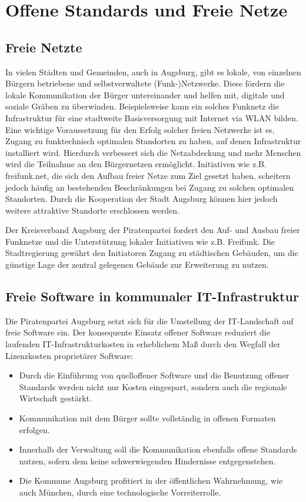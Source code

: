 \chapter{Offene Standards und Freie Netze}
  
  \section{Freie Netzte}
  
  In vielen Städten und Gemeinden, auch in Augsburg, gibt es lokale, von 
  einzelnen Bürgern betriebene und selbstverwaltete (Funk-)Netzwerke. Diese 
  fördern die lokale Kommunikation der Bürger untereinander und helfen mit, 
  digitale und soziale Gräben zu überwinden. Beispielsweise kann ein solches 
  Funknetz die Infrastruktur für eine stadtweite Basisversorgung mit Internet 
  via WLAN bilden. Eine wichtige Voraussetzung für den Erfolg solcher freien 
  Netzwerke ist es, Zugang zu funktechnisch optimalen Standorten zu haben, auf 
  denen Infrastruktur installiert wird. Hierdurch verbessert sich die 
  Netzabdeckung und mehr Menschen wird die Teilnahme an den Bürgernetzen 
  ermöglicht. Initiativen wie z.B. freifunk.net, die sich den Aufbau freier 
  Netze zum Ziel gesetzt haben, scheitern jedoch häufig an bestehenden 
  Beschränkungen bei Zugang zu solchen optimalen Standorten. Durch die 
  Kooperation der Stadt Augsburg können hier jedoch weitere attraktive 
  Standorte erschlossen werden.
  
  Der Kreisverband Augsburg der Piratenpartei fordert den Auf- und Ausbau 
  freier Funknetze und die Unterstützung lokaler Initiativen wie z.B. 
  Freifunk. Die Stadtregierung gewährt den Initiatoren Zugang zu 
  städtischen Gebäuden, um die günstige Lage der zentral gelegenen Gebäude zur 
  Erweiterung zu nutzen. 
  
  \section{Freie Software in kommunaler IT-Infrastruktur}
  
  Die Piratenpartei Augsburg setzt sich für die Umstellung der IT-Landschaft 
  auf freie Software ein. Der konsequente Einsatz offener Software reduziert 
  die laufenden IT-Infrastrukturkosten in erheblichem Maß durch den Wegfall 
  der Lizenzkosten proprietärer Software:
  
  \begin{itemize}
    \item Durch die Einführung von quelloffener Software und die Benutzung 
    offener Standards werden nicht nur Kosten eingespart, sondern auch die 
    regionale Wirtschaft gestärkt.
    \item Kommunikation mit dem Bürger sollte vollständig in offenen Formaten 
    erfolgen.
    \item Innerhalb der Verwaltung soll die Kommunikation ebenfalls offene 
    Standards nutzen, sofern dem keine schwerwiegenden Hindernisse 
    entgegenstehen.
    \item Die Kommune Augsburg profitiert in der öffentlichen Wahrnehmung, wie 
    auch München, durch eine technologische Vorreiterrolle. 
  \end{itemize}
  
